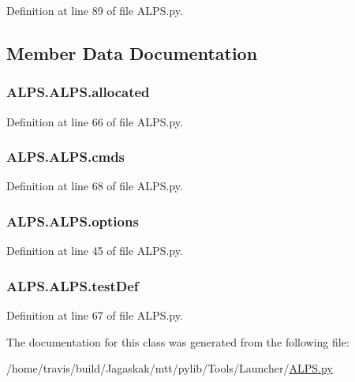 Definition at line 89 of file A\-L\-P\-S.\-py.



\subsection{Member Data Documentation}
\hypertarget{classALPS_1_1ALPS_ac371dce53e8c120f7031259025562bdb}{
\subsubsection[{allocated}]{\setlength{\rightskip}{0pt plus 5cm}A\-L\-P\-S.\-A\-L\-P\-S.\-allocated}}\label{classALPS_1_1ALPS_ac371dce53e8c120f7031259025562bdb}


Definition at line 66 of file A\-L\-P\-S.\-py.

\hypertarget{classALPS_1_1ALPS_a64bae95ba692ef4df06f716692b50ee9}{
\subsubsection[{cmds}]{\setlength{\rightskip}{0pt plus 5cm}A\-L\-P\-S.\-A\-L\-P\-S.\-cmds}}\label{classALPS_1_1ALPS_a64bae95ba692ef4df06f716692b50ee9}


Definition at line 68 of file A\-L\-P\-S.\-py.

\hypertarget{classALPS_1_1ALPS_a24dfa9b508f507c4cb6148f10a081555}{
\subsubsection[{options}]{\setlength{\rightskip}{0pt plus 5cm}A\-L\-P\-S.\-A\-L\-P\-S.\-options}}\label{classALPS_1_1ALPS_a24dfa9b508f507c4cb6148f10a081555}


Definition at line 45 of file A\-L\-P\-S.\-py.

\hypertarget{classALPS_1_1ALPS_a839c4f84a46683221d51004c08345ff2}{
\subsubsection[{test\-Def}]{\setlength{\rightskip}{0pt plus 5cm}A\-L\-P\-S.\-A\-L\-P\-S.\-test\-Def}}\label{classALPS_1_1ALPS_a839c4f84a46683221d51004c08345ff2}


Definition at line 67 of file A\-L\-P\-S.\-py.



The documentation for this class was generated from the following file\-:\begin{DoxyCompactItemize}
\item 
/home/travis/build/\-Jagaskak/mtt/pylib/\-Tools/\-Launcher/\hyperlink{ALPS_8py}{A\-L\-P\-S.\-py}\end{DoxyCompactItemize}
